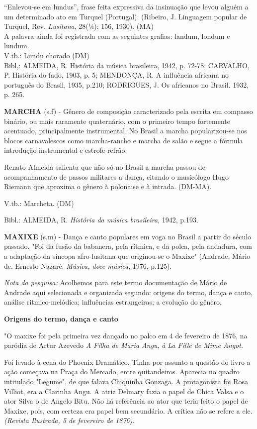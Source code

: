 ``Enlevou-se em lundus'', frase feita expressiva da insinuação que levou
alguém a um determinado ato em Turquel (Portugal). (Ribeiro, J.
Linguagem popular de Turquel, Rev. \emph{Lusitana}, 28(¼); 156, 1930).
(MA)\\
A palavra ainda foi registrada com as seguintes grafias: landum, londum
e lundum.\\
V.tb.: Lundu chorado (DM)\\
Bibl,: ALMEIDA, R. História da música brasileira, 1942, p. 72-78;
CARVALHO, P. História do fado, 1903, p. 5; MENDONÇA, R. A influência
africana no português do Brasil, 1935, p.210; RODRIGUES, J. Os africanos
no Brasil. 1932, p. 265.

\textbf{MARCHA} (s.f) - Gênero de composição caracterizado pela escrita
em compasso binário, ou mais raramente quaternário, com o primeiro tempo
fortemente acentuado, principalmente instrumental. No Brasil a marcha
popularizou-se nos blocos carnavalescos como marcha-rancho e marcha de
salão e segue a fórmula introdução instrumental e estrofe-refrão.

Renato Almeida salienta que não só no Brasil a marcha passou de
acompanhamento de passos militares a dança, citando o musicólogo Hugo
Riemann que aproxima o gênero à polonaise e à intrada. (DM-MA).

V.tb.: Marcheta. (DM)

Bibl.: ALMEIDA, R. \emph{História da música brasileira}, 1942, p.193.

\textbf{MAXIXE} (s.m) - Dança e canto populares em voga no Brasil a
partir do século passado. "Foi da fusão da babanera, pela rítmica, e da
polca, pela andadura, com a adaptação da síncopa afro-lusitana que
originou-se o Maxixe" (Andrade, Mário de. Ernesto Nazaré. \emph{Música,
doce música}, 1976, p.125).

\emph{Nota da pesquisa:} Acolhemos para este termo documentação de Mário
de Andrade aqui selecionada e organizada segundo: origens do termo,
dança e canto, análise ritmico-melódica; influências estrangeiras; a
evolução do gênero,

\textbf{Origens do termo, dança e canto}

"O maxixe foi pela primeira vez dançado no palco em 4 de fevereiro de
1876, na paródia de Artur Azevedo \emph{A Filha de Maria Angu}, \emph{à
La Fille de Mime Angot.}

Foi levado à cena do Phoenix Dramático. Tinha por assunto a questão do
livro a ação começava na Praça do Mercado, entre quitandeiros. Aparecia
no quadro intitulado "Legume", de que falava Chiquinha Gonzaga. A
protagonista foi Rosa Villiot, era a Clarinha Angu. A atriz Delmary
fazia o papel de Chica Valsa e o ator Silva o de Angelo Bitu. Não há
referência ao ator que teria feito o papel de Maxixe, pois, com certeza
era papel bem secundário. A crítica não se refere a ele. \emph{(Revista
Ilustrada, 5 de fevereiro de 1876).}

